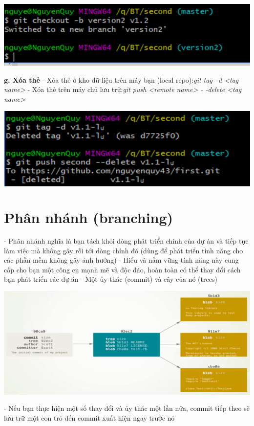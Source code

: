 \documentclass[12pt,a4paper]{report}
\begin{document}
	\includegraphics[width=0.8\linewidth]{screenshot046}

	\label{fig:screenshot046}
\vskip 0.4cm\vskip 0.4cm
{\bf g. Xóa thẻ}\vskip 0.4cm
- Xóa thẻ ở kho dữ liệu trên máy bạn (local repo):{\it  git tag –d <tag name>}\vskip 0.4cm
- Xóa thẻ trên máy chủ lưu trữ:{\it git push <remote name> - -delete <tag name>}\vskip 0.4cm

	\includegraphics[width=0.8\linewidth]{screenshot047}
	
	\label{fig:screenshot047}




				
\section{Phân nhánh (branching)}
\hspace{0.6cm}- Phân nhánh nghĩa là bạn tách khỏi dòng phát triển chính của dự án và tiếp tục làm việc mà không gây rối tới dòng chính đó (dùng để phát triển tính năng cho các phần mềm không gây ảnh hưởng)\vskip 0.4cm
- Hiểu và nắm vững tính năng này cung cấp cho bạn một công cụ mạnh mẽ và độc đáo, hoàn toàn có thể thay đổi cách bạn phát triển các dự án\vskip 0.4cm
- Một ủy thác (commit) và cây của nó (trees)\vskip 0.4cm

	\includegraphics[width=0.8\linewidth]{screenshot048}

	\label{fig:screenshot048}
\vskip 0.4cm\vskip 0.4cm
- Nếu bạn thực hiện một số thay đổi và ủy thác một lần nữa, commit tiếp theo sẽ lưu trữ một con trỏ đến commit xuất hiện ngay trước nó\vskip 0.4cm
\end{document}
